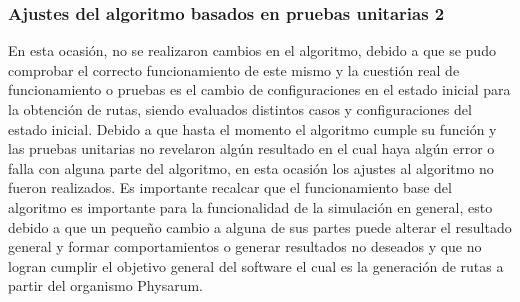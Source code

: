 \subsubsection{Ajustes del algoritmo basados en pruebas unitarias 2}
    En esta ocasi\'on, no se realizaron cambios en el algoritmo,
        debido a que se pudo comprobar el correcto funcionamiento
        de este mismo y la cuesti\'on real de funcionamiento o
        pruebas es el cambio de configuraciones en el estado inicial
        para la obtenci\'on de rutas, siendo evaluados distintos casos y
        configuraciones del estado inicial.
    \vskip 0.5cm
    Debido a que hasta el momento el algoritmo cumple su
        funci\'on y las pruebas unitarias no revelaron alg\'un resultado
        en el cual haya alg\'un error o falla con alguna parte del
        algoritmo, en esta ocasi\'on los ajustes al algoritmo no fueron
        realizados.
    \vskip 0.5cm
    Es importante recalcar que el funcionamiento base del
        algoritmo es importante para la funcionalidad de la
        simulaci\'on en general, esto debido a que un peque\~no cambio
        a alguna de sus partes puede alterar el resultado general y
        formar comportamientos o generar resultados no deseados y
        que no logran cumplir el objetivo general del software el
        cual es la generaci\'on de rutas a partir del organismo
        Physarum.
